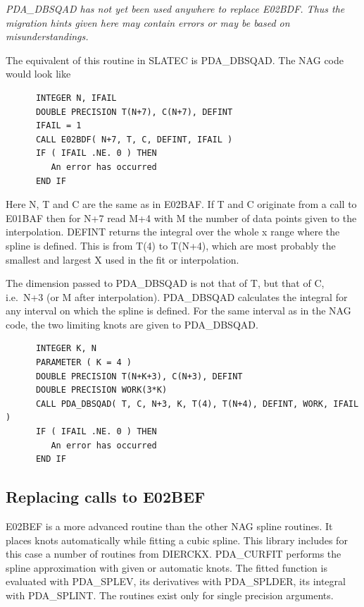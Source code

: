 \documentclass[11pt,twoside]{article}
\newcommand{\htmlref}[2]{#1}
\newcommand{\xlabel}[1]{}
\begin{document}
{\em
   PDA\_DBSQAD has not yet been used anywhere to replace E02BDF. Thus the
   migration hints given here may contain errors or may be based on
   misunderstandings.
\/}

   The equivalent of this routine in SLATEC is
\htmlref{PDA\_DBSQAD.}{PDA\_DBSQAD}
   The NAG code
   would look like

\begin{verbatim}
      INTEGER N, IFAIL
      DOUBLE PRECISION T(N+7), C(N+7), DEFINT
      IFAIL = 1
      CALL E02BDF( N+7, T, C, DEFINT, IFAIL )
      IF ( IFAIL .NE. 0 ) THEN
         An error has occurred
      END IF
\end{verbatim}

   Here N, T and C are the same as in
\htmlref{E02BAF.}{m_e02baf}
   If T and C originate from
   a call to
\htmlref{E01BAF}{m_e01baf}
   then for N+7 read M+4 with M the number of data
   points given to the interpolation. DEFINT returns the integral over
   the whole x range where the spline is defined. This is from T(4) to
   T(N+4), which are most probably the smallest and largest X used in
   the fit or interpolation.

   The dimension passed
   to PDA\_DBSQAD is not that of T, but that of C, i.e.\ N+3 (or M after
   interpolation). PDA\_DBSQAD calculates the integral for any interval
   on which the spline is defined. For the same interval as in the NAG
   code, the two limiting knots are given to PDA\_DBSQAD.

\begin{verbatim}
      INTEGER K, N
      PARAMETER ( K = 4 )
      DOUBLE PRECISION T(N+K+3), C(N+3), DEFINT
      DOUBLE PRECISION WORK(3*K)
      CALL PDA_DBSQAD( T, C, N+3, K, T(4), T(N+4), DEFINT, WORK, IFAIL )
      IF ( IFAIL .NE. 0 ) THEN
         An error has occurred
      END IF
\end{verbatim}


\subsection{\xlabel{replacing_calls_to_e02bef}Replacing calls to E02BEF}

   E02BEF is a more advanced routine than the other NAG spline routines.
   It places knots automatically while fitting a cubic spline. This
   library includes for this case a number of routines from DIERCKX.
\htmlref{PDA\_CURFIT}{PDA\_CURFIT}
   performs the spline approximation with given or
   automatic knots. The fitted function is evaluated with
\htmlref{PDA\_SPLEV,}{PDA\_SPLEV}
   its
   derivatives with
\htmlref{PDA\_SPLDER,}{PDA\_SPLDER}
   its integral with
\htmlref{PDA\_SPLINT.}{PDA\_SPLINT}
   The routines exist
   only for single precision arguments.
\end{document}
